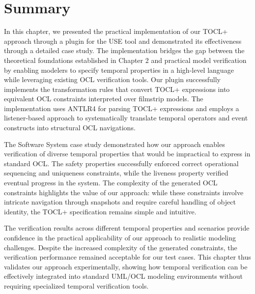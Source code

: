 \section{Summary}
\hspace{1cm} In this chapter, we presented the practical implementation of our TOCL+ 
approach through a plugin for the USE tool and demonstrated its effectiveness through 
a detailed case study. The implementation bridges the gap between the theoretical 
foundations established in Chapter 2 and practical model verification by enabling 
modelers to specify temporal properties in a high-level language while leveraging 
existing OCL verification tools. Our plugin successfully implements the transformation 
rules that convert TOCL+ expressions into equivalent OCL constraints interpreted 
over filmstrip models. The implementation uses ANTLR4 for parsing TOCL+ expressions 
and employs a listener-based approach to systematically translate temporal operators 
and event constructs into structural OCL navigations.

The Software System case study demonstrated how our approach enables verification 
of diverse temporal properties that would be impractical to express in standard OCL. 
The safety properties successfully enforced correct operational sequencing and 
uniqueness constraints, while the liveness property verified eventual progress in 
the system. The complexity of the generated OCL constraints highlights the value of 
our approach: while these constraints involve intricate navigation through snapshots 
and require careful handling of object identity, the TOCL+ specification remains 
simple and intuitive.

The verification results across different temporal properties and scenarios provide 
confidence in the practical applicability of our approach to realistic modeling 
challenges. Despite the increased complexity of the generated constraints, the 
verification performance remained acceptable for our test cases. This chapter thus 
validates our approach experimentally, showing how temporal verification can be 
effectively integrated into standard UML/OCL modeling environments without requiring 
specialized temporal verification tools.


